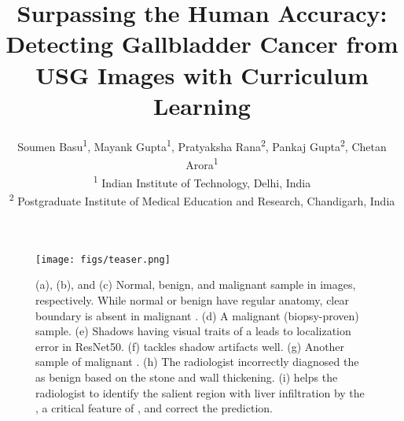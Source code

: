 \documentclass[10pt,twocolumn,letterpaper]{article}
\begin{document}
\title{Surpassing the Human Accuracy: \\ Detecting Gallbladder Cancer from USG Images with Curriculum Learning}

\author{Soumen Basu\textsuperscript{1}, Mayank Gupta\textsuperscript{1}, Pratyaksha Rana\textsuperscript{2}, Pankaj Gupta\textsuperscript{2}, Chetan Arora\textsuperscript{1} \\
\textsuperscript{1} Indian Institute of Technology, Delhi, India \\ 
\textsuperscript{2} Postgraduate Institute of Medical Education and Research, Chandigarh, India\\
}

\maketitle



\begin{figure}[t]
    \centering
    \texttt{[image: figs/teaser.png]}
    \caption{(a), (b), and (c) Normal, benign, and malignant \gb sample in \usg images, respectively. While normal or benign \gb have regular anatomy, clear boundary is absent in malignant \gb. (d) A malignant (biopsy-proven) \gb sample. (e) Shadows having visual traits of a \gb leads to localization error in ResNet50. (f) \gbcnet tackles shadow artifacts well. (g) Another sample of malignant \gb. (h) The radiologist incorrectly diagnosed the \gb as benign based on the stone and wall thickening. (i) \gbcnet helps the radiologist to identify the salient region with liver infiltration by the \gb, a critical feature of \gbc, and correct the prediction.}
    \label{fig:teaser}
\end{figure}
\end{document}
